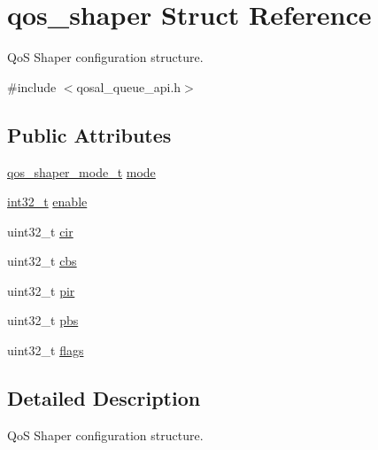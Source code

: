 \hypertarget{structqos__shaper}{\section{qos\-\_\-shaper Struct Reference}
\label{structqos__shaper}
}


Qo\-S Shaper configuration structure.  




{\ttfamily \#include $<$qosal\-\_\-queue\-\_\-api.\-h$>$}

\subsection*{Public Attributes}
\begin{DoxyCompactItemize}
\item 
\hyperlink{group__FAPI__QOS__QUEUE_ga59365e8b97823ce54ac3e627abc95dd5}{qos\-\_\-shaper\-\_\-mode\-\_\-t} \hyperlink{structqos__shaper_acefce05f90c1f51f5a6bf24e5524b3c2}{mode}
\item 
\hyperlink{commondefs_8h_a32f2e37ee053cf2ce8ca28d1f74630e5}{int32\-\_\-t} \hyperlink{structqos__shaper_ad1b7efd18e5095785a39d68be0c78526}{enable}
\item 
uint32\-\_\-t \hyperlink{structqos__shaper_a2c7152c0874f25897814ad448a31f5b5}{cir}
\item 
uint32\-\_\-t \hyperlink{structqos__shaper_a69e81808fcb80ba8189a672a27798bff}{cbs}
\item 
uint32\-\_\-t \hyperlink{structqos__shaper_a09b81bffad8b09bd73100dbd781b2b3c}{pir}
\item 
uint32\-\_\-t \hyperlink{structqos__shaper_a38f8330e5af78779bd61778d6495179a}{pbs}
\item 
uint32\-\_\-t \hyperlink{structqos__shaper_a02926e1c2b7380a30716b5c72b1057e1}{flags}
\end{DoxyCompactItemize}


\subsection{Detailed Description}
Qo\-S Shaper configuration structure. 

